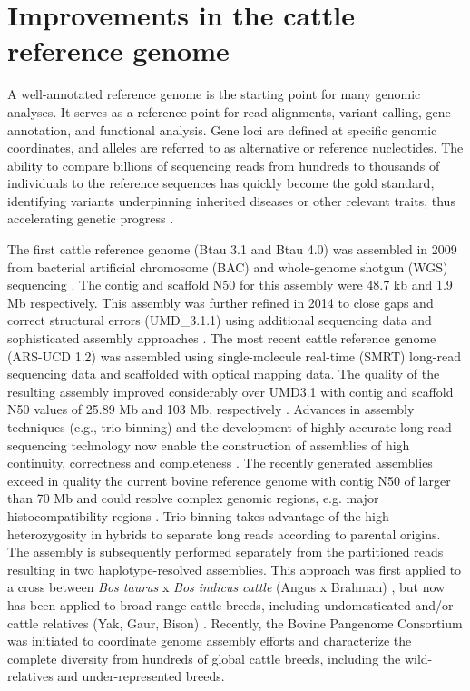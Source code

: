 \documentclass[../main.tex]{subfiles}
\begin{document}
\section{Improvements in the cattle reference genome} 

A well-annotated reference genome is the starting point for many genomic analyses. It serves as a reference point for read alignments, variant calling, gene annotation, and functional analysis. Gene loci are defined at specific genomic coordinates, and alleles are referred to as alternative or reference  nucleotides. The ability to compare billions of sequencing reads from hundreds to thousands of individuals to the reference sequences has quickly become the gold standard, identifying variants underpinning  inherited diseases or other relevant traits, thus accelerating genetic progress \citep{bickhart2020symposium}.

The first cattle reference genome (Btau 3.1 and Btau 4.0) was assembled in 2009 from bacterial artificial chromosome (BAC) and whole-genome shotgun (WGS) sequencing \citep{elsik2009genome}. The contig and scaffold N50 for this assembly were 48.7 kb and 1.9 Mb respectively. This assembly was further refined in 2014 to close gaps and correct structural errors (UMD\_3.1.1) using additional sequencing data and sophisticated assembly approaches \citep{zimin2009whole}. The most recent cattle reference genome (ARS-UCD 1.2) was assembled using single-molecule real-time (SMRT) long-read sequencing data and scaffolded with optical mapping data. The quality of the resulting assembly improved considerably over UMD3.1 with contig and scaffold N50 values of 25.89 Mb and 103 Mb, respectively \citep{rosen2020novo}. Advances in assembly techniques (e.g., trio binning) and the development of highly accurate long-read sequencing technology now enable the construction of assemblies of high continuity, correctness and completeness \citep{bickhart2020symposium}. The recently generated assemblies exceed in quality the current bovine reference genome with contig N50 of larger than 70 Mb and could resolve complex genomic regions, e.g. major histocompatibility regions \citep{rice2020continuous}. Trio binning takes advantage of the high heterozygosity in hybrids to separate long reads according to parental origins. The assembly is subsequently performed separately from the partitioned reads resulting in two haplotype-resolved assemblies. This approach  was first applied  to a cross between \emph{Bos taurus} x \emph{Bos indicus cattle} (Angus x Brahman) \citep{koren2018novo}, but now has been applied to broad range cattle breeds, including  undomesticated and/or cattle relatives (Yak, Gaur, Bison) \citep{oppenheimer2021reference}. Recently, the Bovine Pangenome Consortium \citep{heaton2021reference} was initiated to coordinate genome assembly efforts and characterize the complete diversity from hundreds of global cattle breeds, including the wild-relatives and under-represented breeds. 
\end{document}
